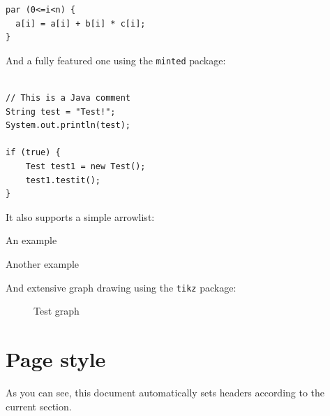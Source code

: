 \documentclass[a4paper,%
11pt,%
DIV=14,
headings=normal,
parskip=full
]{scrartcl}
\begin{document}
\begin{lstlisting}
par (0<=i<n) {
  a[i] = a[i] + b[i] * c[i];
}
\end{lstlisting}

And a fully featured one using the \texttt{minted} package:

\begin{verbatim}

// This is a Java comment
String test = "Test!";
System.out.println(test);

if (true) {
	Test test1 = new Test();
	test1.testit();
}
\end{verbatim}

It also supports a simple arrowlist:

\begin{arrowlist}
\item An example
\item Another example
\end{arrowlist}

And extensive graph drawing using the \texttt{tikz} package:
\begin{figure}
\begin{center}

\end{center}
 \caption{Test graph}
\end{figure}

\pagebreak
\section{Page style}
As you can see, this document automatically sets headers according to the current section.

%
%
\end{document}
